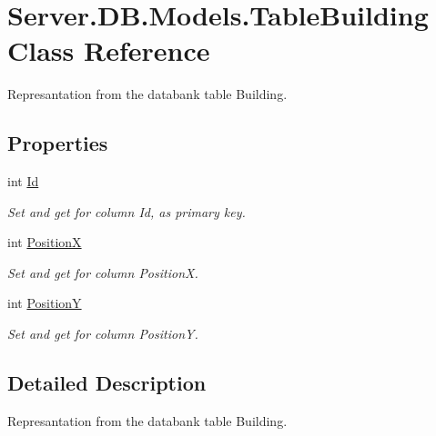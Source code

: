 \hypertarget{classServer_1_1DB_1_1Models_1_1TableBuilding}{\section{Server.\-D\-B.\-Models.\-Table\-Building Class Reference}
\label{classServer_1_1DB_1_1Models_1_1TableBuilding}
}


Represantation from the databank table Building.  


\subsection*{Properties}
\begin{DoxyCompactItemize}
\item 
int \hyperlink{classServer_1_1DB_1_1Models_1_1TableBuilding_a9d598f41ae682a64c7c9cd05e5fcfd97}{Id}
\begin{DoxyCompactList}\small\item\em Set and get for column Id, as primary key. \end{DoxyCompactList}\item 
int \hyperlink{classServer_1_1DB_1_1Models_1_1TableBuilding_a51f82ae3d59ec5972f1203df61f835b7}{Position\-X}
\begin{DoxyCompactList}\small\item\em Set and get for column Position\-X. \end{DoxyCompactList}\item 
int \hyperlink{classServer_1_1DB_1_1Models_1_1TableBuilding_ac12da5d0fc35d3fd054286c48e8e34d6}{Position\-Y}
\begin{DoxyCompactList}\small\item\em Set and get for column Position\-Y. \end{DoxyCompactList}\end{DoxyCompactItemize}


\subsection{Detailed Description}
Represantation from the databank table Building. 



